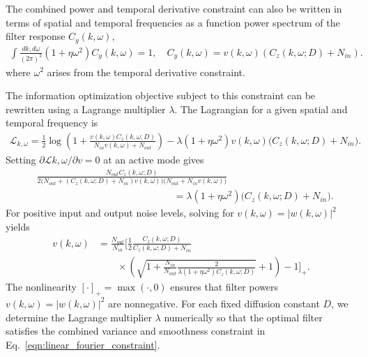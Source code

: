 \documentclass[12pt]{article}
\begin{document}
The combined power and temporal derivative constraint can also be written in terms of spatial and temporal frequencies as a function power spectrum of the filter response $C_y(k,\omega)$,
\begin{align}
    \int \frac{dk,d\omega}{(2\pi)^2} \left(1+\eta\omega^2\right) C_y(k,\omega)=1, \quad C_y(k,\omega) = v(k,\omega)\left(C_z(k,\omega;D)+N_{in}\right).
    \label{eqn:linear_fourier_constraint}
\end{align}
where $\omega^2$ arises from the temporal derivative constraint.

The information optimization objective subject to this constraint can be rewritten using a Lagrange multiplier $\lambda$. The Lagrangian for a given spatial and temporal frequency is
\begin{align}
    \mathcal{L}_{k,\omega} = \frac{1}{2} \log\left(1+\frac{v(k,\omega)C_z(k,\omega;D)}{N_{in}v(k,\omega)+N_{out}}\right) - \lambda(1+\eta\omega^2)v(k,\omega)\big(C_z(k,\omega;D)+N_{in}\big).
\end{align}
Setting $\partial\mathcal{L}{k,\omega}/\partial v=0$ at an active mode gives
\begin{equation}
    \begin{split}
        &\frac{N_{out} C_z(k,\omega;D)} {2\big(N_{out}+(C_z(k,\omega;D)+N_{in})v(k,\omega)\big) \big(N_{out}+N_{in}v(k,\omega)\big)} \\
        &\qquad\qquad\qquad\qquad\qquad\qquad\qquad = \lambda(1+\eta\omega^2) \big(C_z(k,\omega;D)+N_{in}\big).
    \end{split}
\end{equation}
For positive input and output noise levels, solving for $v(k,\omega)=|w(k,\omega)|^2$ yields
\begin{equation}
    \begin{split}
        v(k,\omega) &= \frac{N_{out}}{N_{in}} \Bigg[ \frac{1}{2} \frac{C_z(k,\omega;D)}{C_z(k,\omega;D) + N_{in}} \\
        &\qquad {}\times \left( \sqrt{1 + \frac{N_{in}}{N_{out}} \frac{2}{\lambda(1+\eta\omega^2)C_z(k,\omega;D)}} + 1 \right) - 1 \Bigg]_+ .
    \end{split}
    \label{eqn:v_kw_optimal}
\end{equation}
The nonlinearity $[\cdot]_+ = \max(\cdot,0)$ ensures that filter powers $v(k,\omega)=|w(k,\omega)|^2$ are nonnegative. For each fixed diffusion constant $D$, we determine the Lagrange multiplier $\lambda$ numerically so that the optimal filter satisfies the combined variance and smoothness constraint in Eq.~\ref{eqn:linear_fourier_constraint}.
\end{document}
